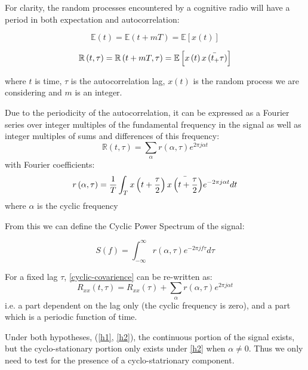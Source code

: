 For clarity, the random processes encountered by a cognitive radio will have a period in both expectation and autocorrelation:

\begin{equation}
\mathbb{E}\left(t\right) = \mathbb{E}\left(t + mT\right) = \mathbb{E}\left[x\left(t\right)\right]
\end{equation}

\begin{equation}
\mathbb{R}\left(t, \tau\right) = \mathbb{R}\left(t + mT, \tau\right) = \mathbb{E}\left[x\left(t\right)\bar{x\left(t_+\tau\right)}\right]
\end{equation}

where \(t\) is time, \(\tau\) is the autocorrelation lag, \(x\left(t\right)\) is the random process we are considering and \(m\) is an integer. 

Due to the periodicity of the autocorrelation, it can be expressed as a Fourier series over integer multiples of the fundamental frequency in the signal as well as integer multiples of sums and differences of this frequency:
%
\begin{equation}
\mathbb{R}\left(t, \tau\right) = \sum_{\alpha} r\left(\alpha, \tau\right) e^{2\pi j \alpha t}  
\end{equation}
\label{cyclic-covarience}
%
with Fourier coefficients:
%
\begin{equation}
r\left(\alpha, \tau\right) = \frac{1}{T} \int_{T} x\left(t+\frac{\tau}{2}\right)\bar{x\left(t+\frac{\tau}{2}\right)} e^{-2\pi j \alpha t} dt
\end{equation}
%
where \(\alpha\) is the cyclic frequency

From this we can define the Cyclic Power Spectrum of the signal:

\begin{equation}
S\left(f\right) = \int_{-\infty}^{\infty} r\left(\alpha, \tau\right) e^{-2 \pi j f \tau} d\tau
\end{equation}

For a fixed lag \(\tau\), \ref{cyclic-covarience} can be re-written as:
%
\begin{equation}
R_{xx}\left(t, \tau \right) = R_{xx}\left(\tau\right) + \sum_{\alpha} r\left(\alpha, \tau\right) e^{2\pi j \alpha t}  
\end{equation}
%
i.e. a part dependent on the lag only (the cyclic frequency is zero), and a part which is a periodic function of time. 

Under both hypotheses, (\ref{h1}, \ref{h2}), the continuous portion of the signal exists, but the cyclo-stationary portion only exists under \ref{h2} when \(\alpha \neq 0\). Thus we only need to test for the presence of a cyclo-statrionary component. 


